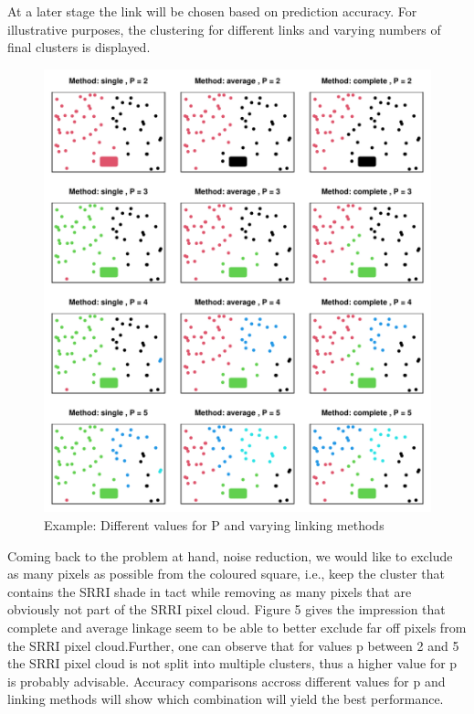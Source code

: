 \documentclass[aodsor,preprint]{imsart}
\numberwithin{equation}{section}
\theoremstyle{plain}
\begin{document}
At a later stage the link will be chosen based on prediction accuracy. For illustrative purposes, the clustering for different links and varying numbers of final clusters is displayed.\newpage

\begin{figure}[H]
	\includegraphics[width = 12cm]{methodsclust.pdf}
	\caption{Example: Different values for P and varying linking methods}
	\label{fig5}
\end{figure}

Coming back to the problem at hand, noise reduction, we would like to exclude as many pixels as possible from the coloured square, i.e., keep the cluster that contains the SRRI shade in tact while removing as many pixels that are obviously not part of the SRRI pixel cloud. Figure 5 gives the impression that complete and average linkage seem to be able to better exclude far off pixels from the SRRI pixel cloud.Further, one can observe that for values p between 2 and 5 the SRRI pixel cloud is not split into multiple clusters, thus a higher value for p is probably advisable. Accuracy comparisons accross different values for p and linking methods will show which combination will yield the best performance.\newpage
\end{document}
